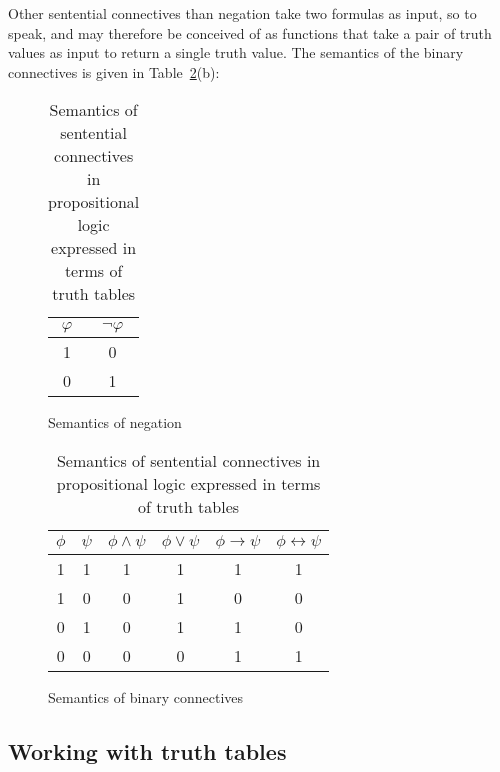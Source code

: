 \documentclass[nobib,nofonts]{tufte-handout}
\begin{document}
Other sentential connectives than negation take two formulas as input, so to speak, and may therefore be conceived of as functions that take a pair of truth values as input to return a single truth value.
The semantics of the binary connectives is given in Table~\ref{tab:semantics-binary-connectives}(b):

\begin{table}
  \begin{subfigure}[b]{0.3\textwidth}
    \begin{center}
      \begin{tabular}{cc}
        $\varphi$ & $\neg \varphi$ \\ \midrule
        1  & 0\\
        0  & 1
      \end{tabular}
    \end{center}
    \caption{Semantics of negation}
  \end{subfigure}
  \hfill
  \begin{subfigure}[b]{0.75\textwidth}
    \centering
    \begin{tabular}{cccccc}
      $\phi$ & $\psi$ & $\phi \wedge \psi$ & $\phi \vee \psi$ & $\phi \rightarrow \psi$ & $\phi \leftrightarrow \psi$ \\ \midrule
      1  & 1 & 1 & 1 & 1 & 1 \\
      1  & 0 & 0 & 1 & 0 & 0 \\
      0  & 1 & 0 & 1 & 1 & 0 \\
      0  & 0 & 0 & 0 & 1 & 1 \\
    \end{tabular}
    \caption{Semantics of binary connectives}
  \end{subfigure}
  \caption{Semantics of sentential connectives in propositional logic expressed in terms of truth tables}
  \label{tab:semantics-binary-connectives}
\end{table}

\subsection{Working with truth tables}
\end{document}
